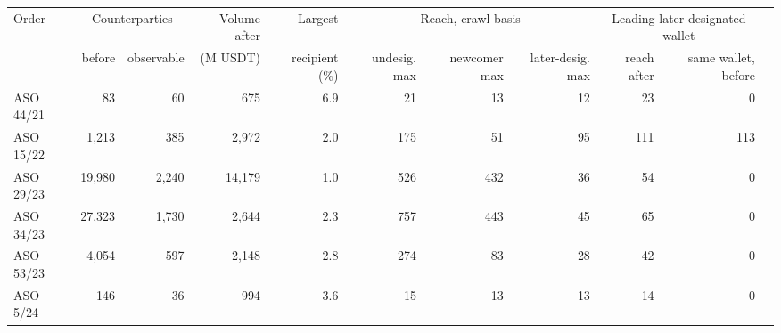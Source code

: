 \begin{tabular}{lrrrrrrrrrr}
\toprule
Order & \multicolumn{2}{c}{Counterparties} & Volume after & Largest & \multicolumn{3}{c}{Reach, crawl basis} & \multicolumn{2}{c}{Leading later-designated wallet} \\
\cmidrule(lr){2-3}\cmidrule(lr){6-8}\cmidrule(lr){9-10}
 & before & observable & (M USDT) & recipient (\%) & undesig. max & newcomer max & later-desig. max & reach after & same wallet, before \\
\midrule
ASO 44/21 & 83 & 60 & 675 & 6.9 & 21 & 13 & 12 & 23 & 0 \\
ASO 15/22 & 1,213 & 385 & 2,972 & 2.0 & 175 & 51 & 95 & 111 & 113 \\
ASO 29/23 & 19,980 & 2,240 & 14,179 & 1.0 & 526 & 432 & 36 & 54 & 0 \\
ASO 34/23 & 27,323 & 1,730 & 2,644 & 2.3 & 757 & 443 & 45 & 65 & 0 \\
ASO 53/23 & 4,054 & 597 & 2,148 & 2.8 & 274 & 83 & 28 & 42 & 0 \\
ASO 5/24 & 146 & 36 & 994 & 3.6 & 15 & 13 & 13 & 14 & 0 \\
\bottomrule
\end{tabular}
